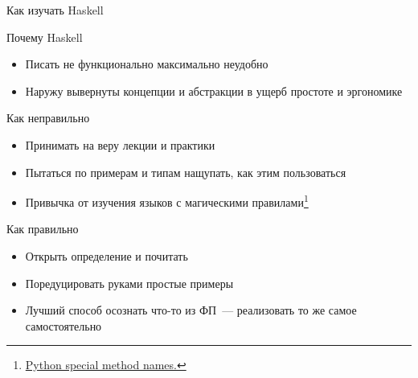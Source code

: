     \begin{frame}{Как изучать Haskell}
        \begin{block}{Почему Haskell}
            \begin{itemize}
                \item Писать не функционально максимально неудобно
                \item Наружу вывернуты концепции и абстракции в ущерб простоте и эргономике
            \end{itemize}
        \end{block}
        \pause
        \begin{block}{\color{red} Как неправильно}
            \begin{itemize}
                \item Принимать на веру лекции и практики
                \item Пытаться по примерам и типам нащупать, как этим пользоваться
                \item Привычка от изучения языков с магическими правилами\footnote{\href{https://docs.python.org/3/reference/datamodel.html\#special-method-names}{\color{blue} Python special method names.}}
            \end{itemize}
        \end{block}
        \pause
        \begin{block}{\color{green} Как правильно}
            \begin{itemize}
                \item Открыть определение и почитать
                \item Поредуцировать руками простые примеры
                \item Лучший способ осознать что-то из ФП~--- реализовать то же самое самостоятельно
            \end{itemize}
        \end{block}
    \end{frame}


